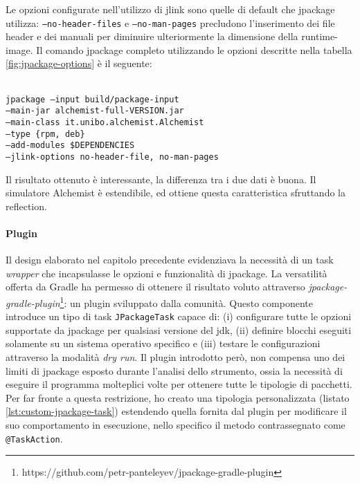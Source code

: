 Le opzioni configurate nell'utilizzo di jlink sono quelle di default che jpackage utilizza: \texttt{--no-header-files} e \texttt{--no-man-pages} precludono l'inserimento dei file header e dei manuali per diminuire ulteriormente la dimensione della runtime-image.
Il comando jpackage completo utilizzando le opzioni descritte nella tabella \ref{fig:jpackage-options} è il seguente:

\texttt{\\ jpackage --input build/package-input \\ \tab\tab --main-jar alchemist-full-VERSION.jar \\ \tab\tab --main-class it.unibo.alchemist.Alchemist \\ \tab\tab --type \{rpm, deb\} \\ \tab\tab --add-modules \$DEPENDENCIES \\ \tab\tab --jlink-options no-header-file, no-man-pages \\}


Il risultato ottenuto è interessante, la differenza tra i due dati è buona.
Il simulatore Alchemist è estendibile, ed ottiene questa caratteristica sfruttando la reflection.



\paragraph{Plugin} Il design elaborato nel capitolo precedente evidenziava la necessità di un task \textit{wrapper} che incapsulasse le opzioni e funzionalità di jpackage. La versatilità offerta da Gradle ha permesso di ottenere il risultato voluto attraverso \textit{jpackage-gradle-plugin}\footnote{https://github.com/petr-panteleyev/jpackage-gradle-plugin}: un plugin sviluppato dalla comunità. Questo componente introduce un tipo di task \texttt{JPackageTask} capace di: (i) configurare tutte le opzioni supportate da jpackage per qualsiasi versione del \ac{jdk}, (ii) definire blocchi eseguiti solamente su un sistema operativo specifico e (iii) testare le configurazioni attraverso la modalità \textit{dry run}. Il plugin introdotto però, non compensa uno dei limiti di jpackage esposto durante l'analisi dello strumento, ossia la necessità di eseguire il programma molteplici volte per ottenere tutte le tipologie di pacchetti. Per far fronte a questa restrizione, ho creato una tipologia personalizzata (listato \ref{lst:custom-jpackage-task}) estendendo quella fornita dal plugin per modificare il suo comportamento in esecuzione, nello specifico il metodo contrassegnato come \texttt{@TaskAction}.

